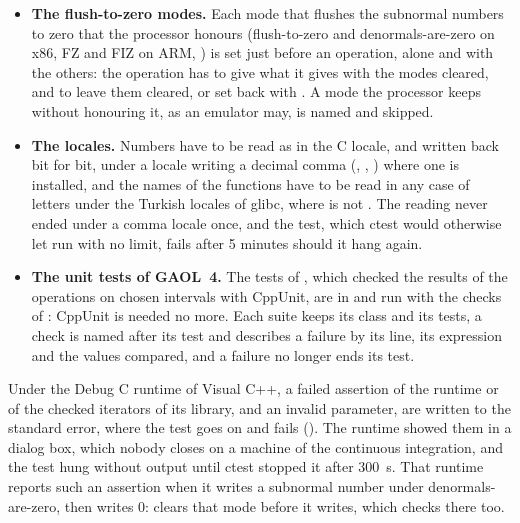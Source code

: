 \documentclass[12pt,a4paper,twoside,openright]{book}
\begin{document}
\begin{itemize}
  states), and has to give the results it gives when called rounding
  upward, and to leave the direction upward, or as it found it with
   ().
\item[$\bullet$] \textbf{The flush-to-zero modes.} Each mode that flushes the
  subnormal numbers to zero that the processor honours (flush-to-zero and
  denormals-are-zero on x86, FZ and FIZ on ARM, ) is set just
  before an operation, alone and with the others: the operation has to give
  what it gives with the modes cleared, and to leave them cleared, or set
  back with . A mode the processor keeps
  without honouring it, as an emulator may, is named and skipped.
\item[$\bullet$] \textbf{The locales.} Numbers have to be read as in the C
  locale, and written back bit for bit, under a locale writing a decimal
  comma (, ,
  ) where one is installed, and the names of the
  functions have to be read in any case of letters under the Turkish
  locales of glibc, where  is not . The
  reading never ended under a comma locale once, and the test, which ctest
  would otherwise let run with no limit, fails after 5 minutes should it
  hang again.
\item[$\bullet$] \textbf{The unit tests of GAOL~4.} The tests of
  , which checked the results of the operations on chosen
  intervals with CppUnit, are in  and run with the checks of
  : CppUnit is needed no more.\newinvfive{} Each suite
  keeps its class and its tests, a check is named after its test and
  describes a failure by its line, its expression and the values compared,
  and a failure no longer ends its test.
\end{itemize}

\begin{Rem}
Under the Debug C runtime of Visual C++, a failed assertion of the runtime
or of the checked iterators of its library, and an invalid parameter, are
written to the standard error, where the test goes on and fails
(). The runtime showed them in a dialog box, which
nobody closes on a machine of the continuous integration, and the test hung
without output until ctest stopped it after 300~s. That runtime reports such
an assertion when it writes a subnormal number under denormals-are-zero, then
writes 0:  clears that mode before it writes, which
 checks there too.\newinvfive
\end{Rem}
\end{document}
